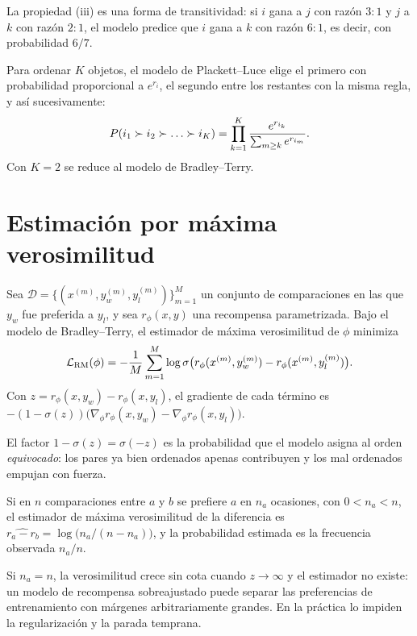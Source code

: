La propiedad (iii) es una forma de transitividad: si $i$ gana a $j$ con razón $3{:}1$ y $j$ a $k$ con razón $2{:}1$, el modelo predice que $i$ gana a $k$ con razón $6{:}1$, es decir, con probabilidad $6/7$.

\begin{definicion}\label{def:pl}
Para ordenar $K$ objetos, el modelo de Plackett--Luce elige el primero con probabilidad proporcional a $e^{r_i}$, el segundo entre los restantes con la misma regla, y así sucesivamente:
\[
P(i_1\pref i_2\pref\dots\pref i_K)=\prod_{k=1}^{K}\frac{e^{r_{i_k}}}{\sum_{m\ge k}e^{r_{i_m}}}.
\]
Con $K=2$ se reduce al modelo de Bradley--Terry.
\end{definicion}

\section{Estimación por máxima verosimilitud}

\begin{proposicion}\label{prop:bt-mv}
Sea $\mathcal{D}=\{(x^{(m)},y_w^{(m)},y_l^{(m)})\}_{m=1}^{M}$ un conjunto de comparaciones en las que $y_w$ fue preferida a $y_l$, y sea $r_\phi(x,y)$ una recompensa parametrizada. Bajo el modelo de Bradley--Terry, el estimador de máxima verosimilitud de $\phi$ minimiza
\[
\mathcal{L}_{\mathrm{RM}}(\phi)=-\frac1M\sum_{m=1}^{M}\log\sigma\bigl(r_\phi(x^{(m)},y_w^{(m)})-r_\phi(x^{(m)},y_l^{(m)})\bigr).
\]
Con $z=r_\phi(x,y_w)-r_\phi(x,y_l)$, el gradiente de cada término es $-(1-\sigma(z))\bigl(\nabla_\phi r_\phi(x,y_w)-\nabla_\phi r_\phi(x,y_l)\bigr)$.
\end{proposicion}

El factor $1-\sigma(z)=\sigma(-z)$ es la probabilidad que el modelo asigna al orden \emph{equivocado}: los pares ya bien ordenados apenas contribuyen y los mal ordenados empujan con fuerza.

\addtocounter{definicion}{1}%

\begin{proposicion}\label{prop:bt-dos}
Si en $n$ comparaciones entre $a$ y $b$ se prefiere $a$ en $n_a$ ocasiones, con $0<n_a<n$, el estimador de máxima verosimilitud de la diferencia es $\widehat{r_a-r_b}=\log\bigl(n_a/(n-n_a)\bigr)$, y la probabilidad estimada es la frecuencia observada $n_a/n$.
\end{proposicion}

Si $n_a=n$, la verosimilitud crece sin cota cuando $z\to\infty$ y el estimador no existe: un modelo de recompensa sobreajustado puede separar las preferencias de entrenamiento con márgenes arbitrariamente grandes. En la práctica lo impiden la regularización y la parada temprana.

